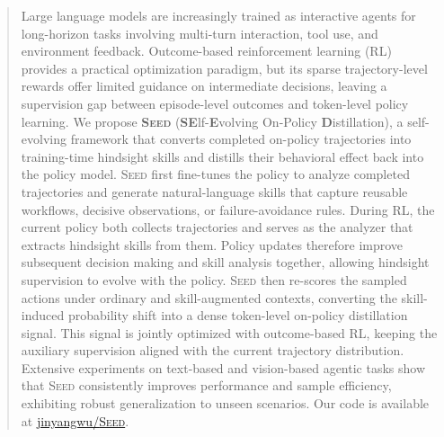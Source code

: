 \begin{abstract}
Large language models are increasingly trained as interactive agents for long-horizon tasks involving multi-turn interaction, tool use, and environment feedback. Outcome-based reinforcement learning (RL) provides a practical optimization paradigm, but its sparse trajectory-level rewards offer limited guidance on intermediate decisions, leaving a supervision gap between episode-level outcomes and token-level policy learning. We propose \textbf{\textsc{Seed}} (\textbf{SE}lf-\textbf{E}volving On-Policy \textbf{D}istillation), a self-evolving framework that converts completed on-policy trajectories into training-time hindsight skills and distills their behavioral effect back into the policy model. \textsc{Seed} first fine-tunes the policy to analyze completed trajectories and generate natural-language skills that capture reusable workflows, decisive observations, or failure-avoidance rules. During RL, the current policy both collects trajectories and serves as the analyzer that extracts hindsight skills from them. Policy updates therefore improve subsequent decision making and skill analysis together, allowing hindsight supervision to evolve with the policy. \textsc{Seed} then re-scores the sampled actions under ordinary and skill-augmented contexts, converting the skill-induced probability shift into a dense token-level on-policy distillation signal. This signal is jointly optimized with outcome-based RL, keeping the auxiliary supervision aligned with the current trajectory distribution. Extensive experiments on text-based and vision-based agentic tasks show that \textsc{Seed} consistently improves performance and sample efficiency, exhibiting robust generalization to unseen scenarios. Our code is available at \href{https://github.com/jinyangwu/SEED}{jinyangwu/\textsc{Seed}}.
\end{abstract}